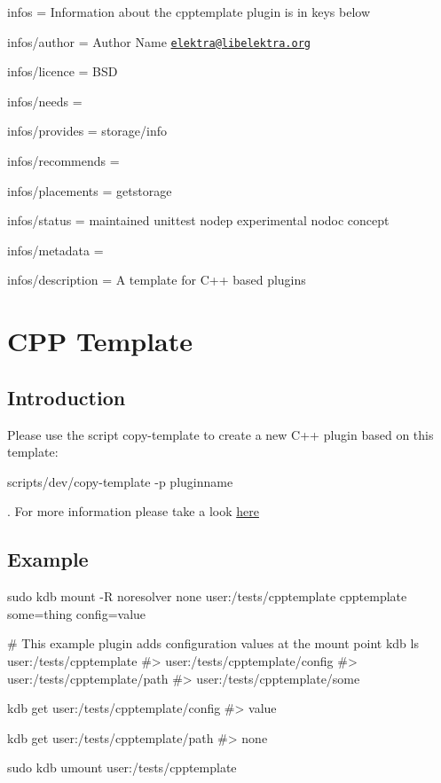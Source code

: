 
\begin{DoxyItemize}
\item infos = Information about the cpptemplate plugin is in keys below
\item infos/author = Author Name \href{mailto:elektra@libelektra.org}{\tt elektra@libelektra.\+org}
\item infos/licence = B\+SD
\item infos/needs =
\item infos/provides = storage/info
\item infos/recommends =
\item infos/placements = getstorage
\item infos/status = maintained unittest nodep experimental nodoc concept
\item infos/metadata =
\item infos/description = A template for C++ based plugins
\end{DoxyItemize}\hypertarget{autotoc_md106_src_plugins_cpptemplate_README_md}{}\section{C\+P\+P Template}\label{autotoc_md106_src_plugins_cpptemplate_README_md}
\hypertarget{autotoc_md106_autotoc_md107}{}\subsection{Introduction}\label{autotoc_md106_autotoc_md107}
Please use the script copy-\/template to create a new C++ plugin based on this template\+:


\begin{DoxyCode}
scripts/dev/copy-template -p pluginname
\end{DoxyCode}


. For more information please take a look \hyperlink{autotoc_md627_src_plugins_template_README_md}{here}\hypertarget{autotoc_md106_autotoc_md108}{}\subsection{Example}\label{autotoc_md106_autotoc_md108}

\begin{DoxyCode}
sudo kdb mount -R noresolver none user:/tests/cpptemplate cpptemplate some=thing config=value

# This example plugin adds configuration values at the mount point
kdb ls user:/tests/cpptemplate
#> user:/tests/cpptemplate/config
#> user:/tests/cpptemplate/path
#> user:/tests/cpptemplate/some

kdb get user:/tests/cpptemplate/config
#> value

kdb get user:/tests/cpptemplate/path
#> none

sudo kdb umount user:/tests/cpptemplate
\end{DoxyCode}
 